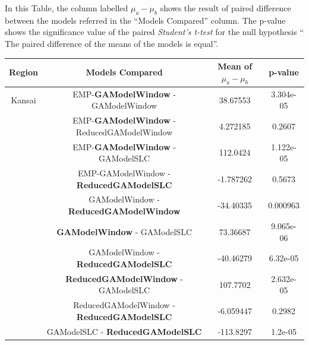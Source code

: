 In this Table, the column labelled $\mu_a - \mu_b$ shows the result of paired difference between the models referred in the ``Models Compared'' column. The p-value shows the significance value of the paired {\it Student's t-test} for the null hypothesis `` The paired difference of the means of the models is equal''.


\begin{table}[!htb]
	\begin{center}
		\begin{tabular}{|c|c|c|c|}
			\hline
			\multicolumn{1}{|c|}{Region} &
			\multicolumn{1}{|c|}{Models Compared} & \multicolumn{1}{|c|}{Mean of $\mu_a - \mu_b$}&
			\multicolumn{1}{|c|}{p-value} \\
			\hline
			
			Kansai & EMP-\textbf{GAModelWindow} - GAModelWindow &
			 38.67553 &  3.304e-05 \\
			
		    & EMP-\textbf{GAModelWindow} - ReducedGAModelWindow & 4.272185  & 0.2607\\
			
			& EMP-\textbf{GAModelWindow} - GAModelSLC & 
			112.0424 &  1.122e-05\\

			&EMP-GAModelWindow - \textbf{ReducedGAModelSLC} &  
			-1.787262 & 0.5673 \\
			
			& GAModelWindow - \textbf{ReducedGAModelWindow} &
			-34.40335 & 0.000963\\
			
			& \textbf{GAModelWindow} - GAModelSLC &
			 73.36687  &9.065e-06\\
				
			& GAModelWindow - \textbf{ReducedGAModelSLC} &
			-40.46279 & 6.32e-05\\
				
			& \textbf{ReducedGAModelWindow} - GAModelSLC &
			107.7702  & 2.632e-05\\

			& ReducedGAModelWindow - \textbf{ReducedGAModelSLC} &
			-6.059447 &0.2982\\

			& GAModelSLC - \textbf{ReducedGAModelSLC} &
			-113.8297 & 1.2e-05\\


\end{tabular}
\end{center}
\end{table}

